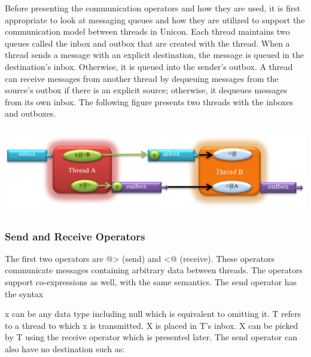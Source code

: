 Before presenting the communication operators and how they are used, it
is first appropriate to look at messaging queues and how they are
utilized to support the communication model between threads in Unicon.
Each thread maintains two queues called the inbox and outbox that are
created with the thread. When a thread sends a message with an explicit
destination, the message is queued in the destination{\textquoteright}s
inbox. Otherwise, it is queued into the sender{\textquoteright}s outbox.
A thread can receive messages from another thread by dequeuing messages
from the source{\textquoteright}s outbox if there is an explicit
source; otherwise, it dequeues messages from its own inbox. The
following figure presents two threads with the inboxes and outboxes.


\bigskip


\includegraphics[width=5.989in,height=1.4807in]{ub-img/thread-fig1.png}



\bigskip


\bigskip


\subsubsection{Send and Receive Operators}

The first two operators are \textsf{@{\textgreater}} (send)
and \textsf{{\textless}@} (receive). These operators
communicate messages containing arbitrary data between threads. The
operators support co-expressions as well, with the same semantics. The
send operator has the syntax 


\textsf{x} can be any data type including null which is
equivalent to omitting it. \textsf{T} refers to a thread to
which \textsf{x} is transmitted. \textsf{X} is
placed in \textsf{T}{\textquoteright}s inbox.
\textsf{X} can be picked by \textsf{T} using the
receive operator which is presented later. The send operator can also
have no destination such as:


